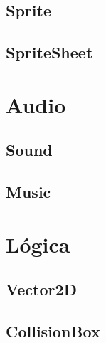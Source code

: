 \documentclass[parskip=half*]{scrartcl}
\begin{document}
	\subsection{Sprite}

	\subsection{SpriteSheet}


\newpage
\section{Audio}
	\subsection{Sound}

	\subsection{Music}


\newpage
\section{L\'ogica}
	\subsection{Vector2D}

	\subsection{CollisionBox}

\end{document}
